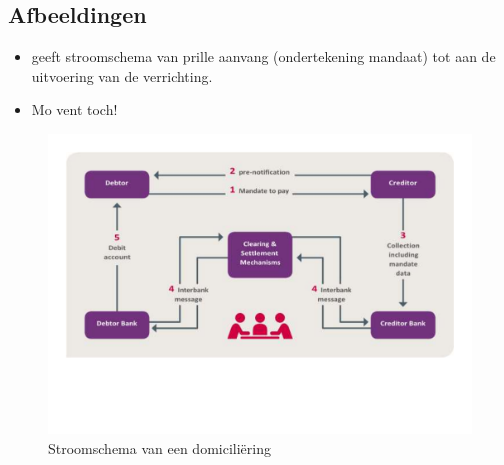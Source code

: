 \documentclass[11pt, a4paper]{article}
\begin{document}
  \subsection{Afbeeldingen}
  \begin{itemize}
    \item
       geeft stroomschema van prille aanvang (ondertekening
      mandaat) tot aan de uitvoering van de verrichting.
    \item
    Mo vent toch!
  \end{itemize}

  \begin{figure}
    \centering
  	\includegraphics[width=\linewidth]{1-2-3-4-5}
    \caption{Stroomschema van een domiciliëring}
    \label{fig:flow}
  \end{figure}
\end{document}
